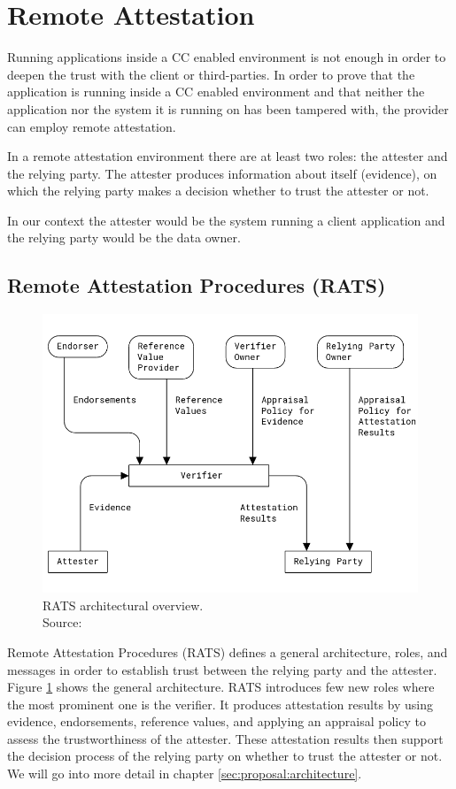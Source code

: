 \section{Remote Attestation}
\label{ch:remote-attestation}

Running applications inside a CC enabled environment is not enough in order to
deepen the trust with the client or third-parties. In order to prove that the
application is running inside a CC enabled environment and that neither the
application nor the system it is running on has been tampered with, the provider
can employ remote attestation.

In a remote attestation environment there are at least two roles: the attester
and the relying party. The attester produces information about itself
(evidence), on which the relying party makes a decision whether to trust the
attester or not.

In our context the attester would be the system running a client application and
the relying party would be the data owner.

\subsection{Remote Attestation Procedures (RATS)}
\label{sec:rats}

\begin{figure}
  \centering
  \includegraphics[width=0.7\linewidth]{resources/rats-architecture.png}
  \caption[RATS architectural overview]{
    RATS architectural overview.\\
    Source:  \cite{rfc9334}
  }
  \label{figure:rats-architecture}
\end{figure}

Remote Attestation Procedures (RATS) defines a general architecture, roles, and
messages in order to establish trust between the relying party and the attester.
Figure \ref{figure:rats-architecture} shows the general architecture. RATS
introduces few new roles where the most prominent one is the verifier. It
produces attestation results by using evidence, endorsements, reference values,
and applying an appraisal policy to assess the trustworthiness of the attester.
These attestation results then support the decision process of the relying party
on whether to trust the attester or not. We will go into more detail in chapter
\ref{sec:proposal:architecture}.

